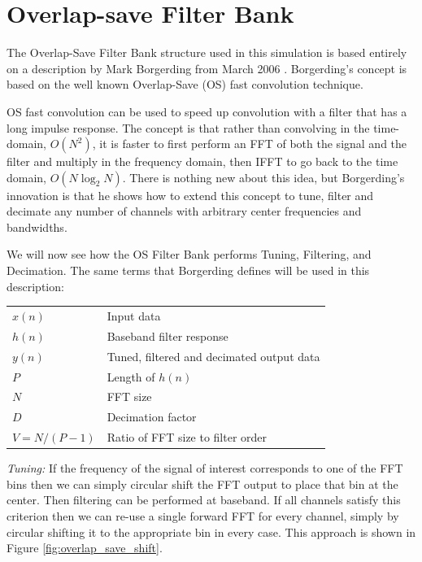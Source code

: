 \documentclass[12pt]{report}
\begin{document}

\section{Overlap-save Filter Bank}
\label{sec:os_filter_bank}
The Overlap-Save Filter Bank structure used in this simulation is based
entirely on a description by Mark Borgerding from March 2006
\cite{Borgerding1}.  Borgerding's concept is based on the well known
Overlap-Save (OS) fast convolution technique.

OS fast convolution can be used to speed up convolution with
a filter that has a long impulse response. The concept is that rather than
convolving in the time-domain, $O(N^2)$, it is faster to first
perform an FFT of both the signal and the filter and multiply in the frequency
domain, then IFFT to go back to the time domain, $O(N\log_2N)$.
There is nothing new about this idea, but Borgerding's innovation is that he
shows how to extend this concept to tune, filter and decimate any number of
channels with arbitrary center frequencies and bandwidths.

We will now see how the OS Filter Bank performs Tuning, Filtering, and
Decimation. The same terms that Borgerding defines will be used in this
description:

\begin{center}
\begin{tabular}{ll}
    $x(n)$        & Input data \\
    $h(n)$        & Baseband filter response \\
    $y(n)$        & Tuned, filtered and decimated output data \\
    $P$           & Length of $h(n)$ \\
    $N$           & FFT size \\
    $D$           & Decimation factor \\
    $V = N/(P-1)$ & Ratio of FFT size to filter order \\
\end{tabular}
\end{center}

\emph{Tuning:} If the frequency of the signal of interest corresponds to one of
the FFT bins then we can simply circular shift the FFT output to place that bin
at the center. Then filtering can be performed at baseband.  If all channels
satisfy this criterion then we can re-use a single forward FFT for every
channel, simply by circular shifting it to the appropriate bin in every case. 
This approach is shown in Figure \ref{fig:overlap_save_shift}.
\end{document}
